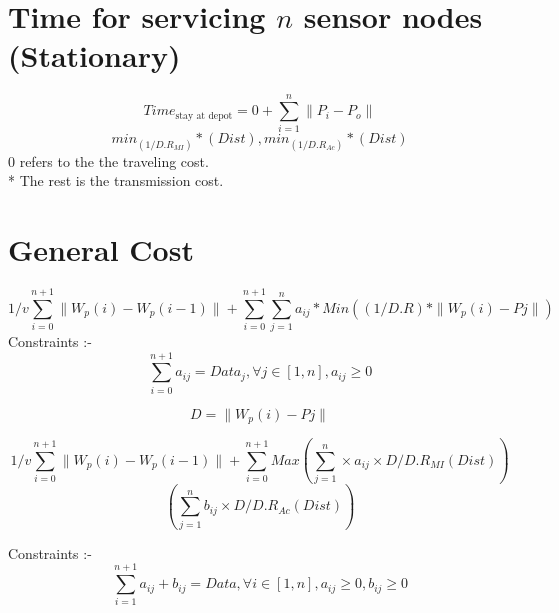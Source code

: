 \documentclass{article}
\begin{document}
\section{Time for servicing $n$ sensor nodes (Stationary)}

\begin{equation}
    \label{equation_2}
    Time_{\textrm{stay at depot}} = 0 + \sum_{i=1}^{n} \|P_{i}-P_{o}\| 
    \end{equation} 
\begin{equation}
    \label{equation_3}
    min_{(1/D.R_{MI})}*(Dist),min_{(1/D.R_{Ac})}*(Dist)  
\end{equation}
0 refers to the the traveling cost.\\*
The rest is the transmission cost.

\section{General Cost}
\label{equation_4}
\begin{equation}
1/v \sum_{i=0}^{n+1} \|W_{p}(i)-W_{p}(i-1)\|+\sum_{i=0}^{n+1}\sum_{j=1}^{n} a_{ij}*Min ((1/D.R)*\|W_{p}(i)-P{j}\|)
\end{equation}
Constraints :-
\label{equation_5}
\begin{equation}
\sum_{i=0}^{n+1} a_{ij} = Data_{j}, \forall j \in [1,n], 
 a_{ij}\geq 0
\end{equation}

\label{equation_6}
\begin{equation}
D = \|W_{p}(i)-P{j}\|
\end{equation}

\label{equation_7}
\begin{equation}
1/v \sum_{i=0}^{n+1} \|W_{p}(i)-W_{p}(i-1)\|+\sum_{i=0}^{n+1}Max(\sum_{j=1}^{n} \times a_{ij}\times D/D.R_{MI}(Dist))  
\end{equation}
\begin{equation}
(\sum_{j=1}^{n} b_{ij}\times D/D.R_{Ac}(Dist))
\end{equation}

Constraints :-
\label{equation_8}
\begin{equation}
\sum_{i=1}^{n+1} a_{ij}+b_{ij}=Data,\forall i \in [1,n], 
 a_{ij}\geq 0,b_{ij}\geq 0
\end{equation}
\end{document}
